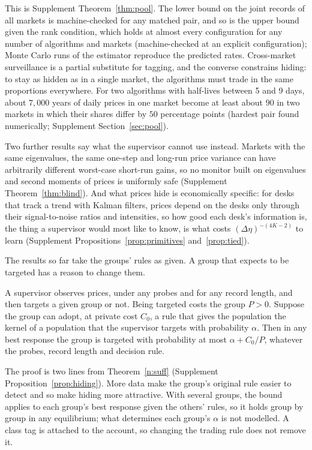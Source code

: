 This is Supplement Theorem~\ref{thm:pool}. The lower bound on the joint records of all markets is machine-checked for any matched pair, and so is the upper bound given the rank condition, which holds at almost every configuration for any number of algorithms and markets (machine-checked at an explicit configuration); Monte Carlo runs of the estimator reproduce the predicted rates. Cross-market surveillance is a partial substitute for tagging, and the converse constrains hiding: to stay as hidden as in a single market, the algorithms must trade in the same proportions everywhere. For two algorithms with half-lives between 5 and 9 days, about $7{,}000$ years of daily prices in one market become at least about $90$ in two markets in which their shares differ by $50$ percentage points (hardest pair found numerically; Supplement Section~\ref{sec:pool}).

Two further results say what the supervisor cannot use instead. Markets with the same eigenvalues, the same one-step and long-run price variance can have arbitrarily different worst-case short-run gains, so no monitor built on eigenvalues and second moments of prices is uniformly safe (Supplement Theorem~\ref{thm:blind}). And what prices hide is economically specific: for desks that track a trend with Kalman filters, prices depend on the desks only through their signal-to-noise ratios and intensities, so how good each desk's information is, the thing a supervisor would most like to know, is what costs $(\Delta\eta)^{-(4K-2)}$ to learn (Supplement Propositions~\ref{prop:primitives} and~\ref{prop:tied}).

The results so far take the groups' rules as given. A group that expects to be targeted has a reason to change them.

\begin{proposition}\label{n:hiding}
A supervisor observes prices, under any probes and for any record length, and then targets a given group or not. Being targeted costs the group $P>0$. Suppose the group can adopt, at private cost $C_0$, a rule that gives the population the kernel of a population that the supervisor targets with probability $\alpha$. Then in any best response the group is targeted with probability at most $\alpha+C_0/P$, whatever the probes, record length and decision rule.
\end{proposition}

The proof is two lines from Theorem~\ref{n:suff} (Supplement Proposition~\ref{prop:hiding}). More data make the group's original rule easier to detect and so make hiding more attractive. With several groups, the bound applies to each group's best response given the others' rules, so it holds group by group in any equilibrium; what determines each group's $\alpha$ is not modelled. A class tag is attached to the account, so changing the trading rule does not remove it.

